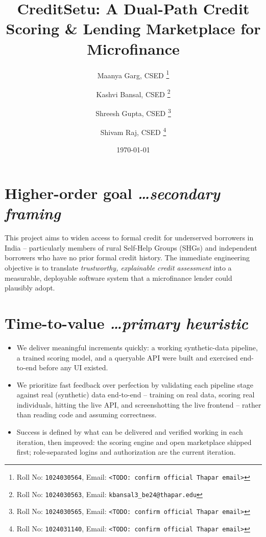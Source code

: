 \documentclass[11pt,a4paper]{article}
\title{CreditSetu: A Dual-Path Credit Scoring \& Lending Marketplace for Microfinance}
\author{
  Maanya Garg, CSED%
  \thanks{Roll No: \texttt{1024030564}, %
    Email: \texttt{<TODO: confirm official Thapar email>}}
  \and
  Kashvi Bansal, CSED%
  \thanks{Roll No: \texttt{1024030563}, %
    Email: \texttt{kbansal3_be24@thapar.edu}}
  \and
  Shreesh Gupta, CSED%
  \thanks{Roll No: \texttt{1024030565}, %
    Email: \texttt{<TODO: confirm official Thapar email>}}
  \and
  Shivam Raj, CSED%
  \thanks{Roll No: \texttt{1024031140}, %
    Email: \texttt{<TODO: confirm official Thapar email>}}
}
\date{\today}
\newcommand{\BvrHint}[1]{%
  {\normalfont\normalsize\itshape\hfill #1}}
\begin{document}
\maketitle

\section{Higher-order goal%
  \BvrHint{\ldots secondary framing}}
This project aims to widen access to formal credit for
underserved borrowers in India -- particularly members
of rural Self-Help Groups (SHGs) and independent
borrowers who have no prior formal credit history. The
immediate engineering objective is to translate
\emph{trustworthy, explainable credit assessment} into a
measurable, deployable software system that a
microfinance lender could plausibly adopt.

\section{Time-to-value %
\BvrHint{\ldots primary heuristic}}
\begin{itemize}[leftmargin=0.7cm]
    \item We deliver meaningful increments quickly: a
    working synthetic-data pipeline, a trained scoring
    model, and a queryable API were built and exercised
    end-to-end before any UI existed.
    \item We prioritize fast feedback over perfection by
    validating each pipeline stage against real
    (synthetic) data end-to-end -- training on real data,
    scoring real individuals, hitting the live API,
    and screenshotting the live frontend -- rather than
    reading code and assuming correctness.
    \item Success is defined by what can be delivered and
    verified working in each iteration, then improved:
    the scoring engine and open marketplace shipped first;
    role-separated logins and authorization are the
    current iteration.
\end{itemize}
\end{document}
